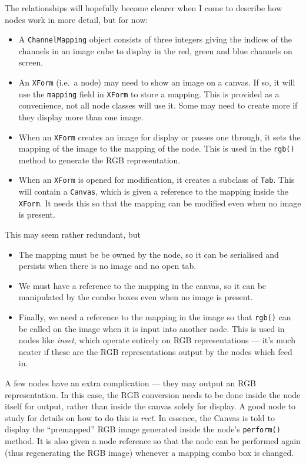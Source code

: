 The relationships will hopefully become clearer when I come to describe how nodes work in more
detail, but for now:
\begin{itemize}
\item A \texttt{ChannelMapping} object consists of three integers giving the indices of 
the channels in an image cube to display in the red, green and blue channels on screen.
\item An \texttt{XForm} (i.e.\ a node) may need to show an image on a canvas. If so, it 
will use the \texttt{mapping} field in \texttt{XForm} to store a mapping. This is provided
as a convenience, not all node classes will use it. Some may need to create more if they 
display more than one image.
\item When an \texttt{XForm} creates an image for display or passes
one through, it sets the mapping of the image to the mapping of the node. This is used in the
\texttt{rgb()} method to generate the RGB representation.
\item When an \texttt{XForm} is opened for modification, it creates a subclass of \texttt{Tab}.
This will contain a \texttt{Canvas}, which is given a reference to the mapping inside the
\texttt{XForm}. It needs this so that the mapping can be modified even when no image is present.
\end{itemize}
This may seem rather redundant, but
\begin{itemize}
\item The mapping must be be owned by the node, so it can be serialised and persists when
there is no image and no open tab.
\item We must have a reference to the mapping in the canvas, so it can be manipulated by
the combo boxes even when no image is present.
\item Finally, we need a reference to the mapping in the image so that \texttt{rgb()} can be called
on the image when it is input into another node. This is used in nodes like \emph{inset}, which
operate entirely on RGB representations --- it's much neater if these are the RGB representations
output by the nodes which feed in.
\end{itemize}
A few nodes have an extra complication --- they may output an RGB representation. In this case, the RGB conversion
needs to be done inside the node itself for output, rather than inside the canvas solely for display. A good node
to study for details on how to do this is \emph{rect}. In essence, the Canvas is told to display the ``premapped''
RGB image generated inside the node's \texttt{perform()} method. It is also given a node reference so that
the node can be performed again (thus regenerating the RGB image) whenever a mapping combo box is changed.

